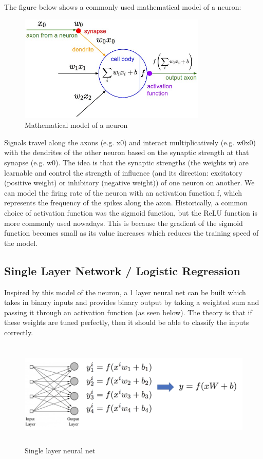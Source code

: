 \documentclass[twoside]{article}
\begin{document}
The figure below shows a commonly used mathematical model of a neuron:

\begin{figure}[!htb]
\centering
\includegraphics[height = 2in]{pics/neuron_model.jpeg}
\caption{Mathematical model of a neuron\cite{cs231n-website}}
\label{fig:neuron_model}
\end{figure}

Signals travel along the axons (e.g. x0) and interact multiplicatively (e.g. w0x0) with the dendrites of the other neuron based on the synaptic strength at that synapse (e.g. w0). The idea is that the synaptic strengths (the weights w) are learnable and control the strength of influence (and its direction: excitatory (positive weight) or inhibitory (negative weight)) of one neuron on another. We can model the firing rate of the neuron with an activation function f, which represents the frequency of the spikes along the axon. Historically, a common choice of activation function was the sigmoid function, but the ReLU function is more commonly used nowadays. This is because the gradient of the sigmoid function becomes small as its value increases which reduces the training speed of the model. 


\subsection{Single Layer Network / Logistic Regression}
Inspired by this model of the neuron, a 1 layer neural net can be built which takes in binary inputs and provides binary output by taking a weighted sum and passing it through an activation function (as seen below). The theory is that if these weights are tuned perfectly, then it should be able to classify the inputs correctly. 


\begin{figure}[!htb]
\centering
\includegraphics[height = 2in]{pics/Logistic_regression.png}
\caption{Single layer neural net\cite{Lecture slides}}
\label{fig:Single layer neural net}
\end{figure}
\end{document}
